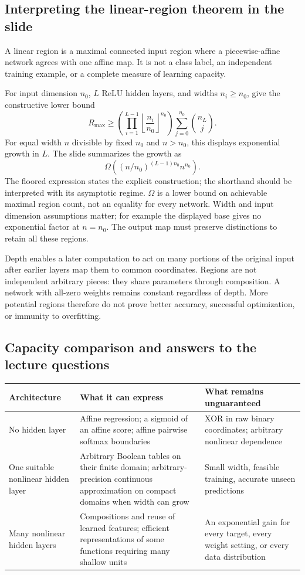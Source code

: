 \subsection{Interpreting the linear-region theorem in the slide}
A linear region is a maximal connected input region where a piecewise-affine network agrees with one affine map. It is not a class label, an independent training example, or a complete measure of learning capacity.

For input dimension $n_0$, $L$ ReLU hidden layers, and widths $n_i\geq n_0$, \citet{montufar2014} give the constructive lower bound
\[
 R_{\max}\geq
 \left(\prod_{i=1}^{L-1}\left\lfloor\frac{n_i}{n_0}\right\rfloor^{n_0}\right)
 \sum_{j=0}^{n_0}\binom{n_L}{j}.
\]
For equal width $n$ divisible by fixed $n_0$ and $n>n_0$, this displays exponential growth in $L$. The slide summarizes the growth as
\[
 \Omega\!\left((n/n_0)^{(L-1)n_0}n^{n_0}\right).
\]
The floored expression states the explicit construction; the shorthand should be interpreted with its asymptotic regime. $\Omega$ is a lower bound on achievable maximal region count, not an equality for every network. Width and input dimension assumptions matter; for example the displayed base gives no exponential factor at $n=n_0$. The output map must preserve distinctions to retain all these regions.

Depth enables a later computation to act on many portions of the original input after earlier layers map them to common coordinates. Regions are not independent arbitrary pieces: they share parameters through composition. A network with all-zero weights remains constant regardless of depth. More potential regions therefore do not prove better accuracy, successful optimization, or immunity to overfitting.

\subsection{Capacity comparison and answers to the lecture questions}
\begin{center}
\small
\begin{tabular}{p{2.6cm}p{5.1cm}p{6cm}}
\toprule
Architecture & What it can express & What remains unguaranteed\\
\midrule
No hidden layer & Affine regression; a sigmoid of an affine score; affine pairwise softmax boundaries & XOR in raw binary coordinates; arbitrary nonlinear dependence\\
One suitable nonlinear hidden layer & Arbitrary Boolean tables on their finite domain; arbitrary-precision continuous approximation on compact domains when width can grow & Small width, feasible training, accurate unseen predictions\\
Many nonlinear hidden layers & Compositions and reuse of learned features; efficient representations of some functions requiring many shallow units & An exponential gain for every target, every weight setting, or every data distribution\\
\bottomrule
\end{tabular}
\end{center}

